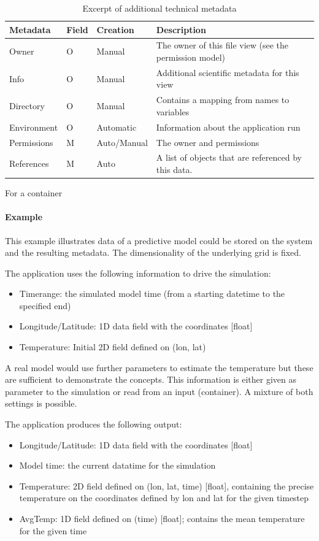 \documentclass{../../template/esiwace-report}
\begin{document}
\begin{table}
\begin{subtable}[t]{\textwidth}
\begin{tabular}{llll}
Metadata & Field & Creation & Description\\
\hline
Owner    & O     & Manual   & The owner of this file view (see the permission model)\\
Info     & O     & Manual   & Additional scientific metadata for this view\\
Directory & O    & Manual   & Contains a mapping from names to variables\\
Environment & O  & Automatic & Information about the application run\\
Permissions & M & Auto/Manual & The owner and permissions \\
References  & M & Auto & A list of objects that are referenced by this data.
\end{tabular}
\caption{For a container}
\end{subtable}
\caption{Excerpt of additional technical metadata}
\label{tbl:additionalTechnicalMetadata}
\end{table}


\paragraph{Example}

This example illustrates data of a predictive model could be stored on the system and the resulting metadata.
The dimensionality of the underlying grid is fixed.

The application uses the following information to drive the simulation:
\begin{itemize}
 \item Timerange: the simulated model time (from a starting datetime to the specified end)
 \item Longitude/Latitude: 1D data field with the coordinates [float]
 \item Temperature: Initial 2D field defined on (lon, lat)
\end{itemize}
A real model would use further parameters to estimate the temperature but these are sufficient to demonstrate the concepts.
This information is either given as parameter to the simulation or read from an input (container).
A mixture of both settings is possible.


The application produces the following output:
\begin{itemize}
  \item Longitude/Latitude: 1D data field with the coordinates [float]
  \item Model time: the current datatime for the simulation
  \item Temperature: 2D field defined on (lon, lat, time) [float], containing the precise temperature on the coordinates defined by lon and lat for the given timestep
  \item AvgTemp: 1D field defined on (time) [float]; contains the mean temperature for the given time
\end{itemize}
\end{document}
